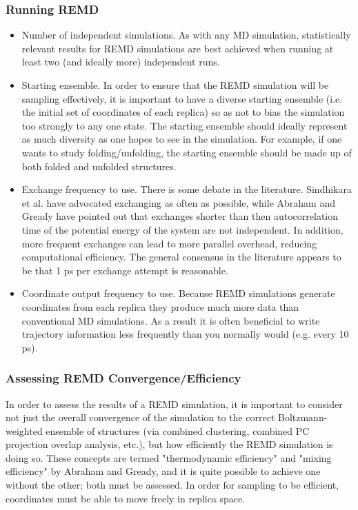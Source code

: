 \subsubsection{Running REMD}
\begin{itemize}
  \item Number of independent simulations. As with any MD simulation, statistically relevant results for REMD simulations are best achieved when running at least two (and ideally more) independent runs.
  \item Starting ensemble. In order to ensure that the REMD simulation will be sampling effectively, it is important to have a diverse starting ensemble (i.e. the initial set of coordinates of each replica) so as not to bias the simulation too strongly to any one state. The starting ensemble should ideally represent as much diversity as one hopes to see in the simulation. For example, if one wants to study folding/unfolding, the starting ensemble should be made up of both folded and unfolded structures.
  \item Exchange frequency to use. There is some debate in the literature. Sindhikara et al. have advocated exchanging as often as possible,\citep{Sindhikara2010} while Abraham and Gready have pointed out that exchanges shorter than then autocorrelation time of the potential energy of the system are not independent.\citep{Abraham2008} In addition, more frequent exchanges can lead to more parallel overhead, reducing computational efficiency. The general consensus in the literature appears to be that 1 ps per exchange attempt is reasonable.
  \item Coordinate output frequency to use. Because REMD simulations generate coordinates from each replica they produce much more data than conventional MD simulations. As a result it is often beneficial to write trajectory information less frequently than you normally would (e.g. every 10 ps). 
\end{itemize}

\subsubsection{Assessing REMD Convergence/Efficiency}
In order to assess the results of a REMD simulation, it is important to consider not just the overall convergence of the simulation to the correct Boltzmann-weighted ensemble of structures (via combined clustering, combined PC projection overlap analysis, etc.), but how efficiently the REMD simulation is doing so. These concepts are termed "thermodynamic efficiency" and "mixing efficiency" by Abraham and Gready,\citep{Abraham2008} and it is quite possible to achieve one without the other; both must be assessed. In order for sampling to be efficient, coordinates must be able to move freely in replica space. 

